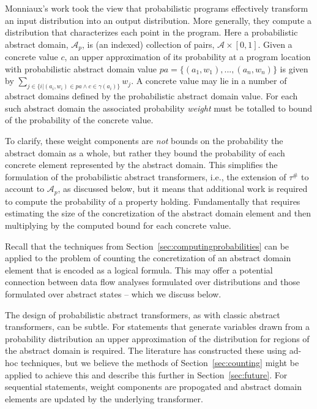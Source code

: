 Monniaux's work took the view that probabilistic programs 
effectively transform an input distribution into an output
distribution.  More generally, they compute a distribution that
characterizes each point in the program.   
Here a probabilistic abstract domain, $\mathcal{A}_p$, 
is (an indexed) collection of pairs, $\mathcal{A} \times [0,1]$.
Given a concrete value $c$, 
an upper approximation of its probability 
at a program location with probabilistic abstract domain
value $pa = \{(a_1,w_1), ..., (a_n,w_n)\}$
is given by $\sum_{j \in \{ i \vert (a_i,w_i) \in pa \wedge   
c \in \gamma(a_i)\}} w_j$.   A concrete
value may lie in a number of abstract domains defined by
the probabilistic abstract domain value.  For each such abstract
domain the associated probability \textit{weight} must be totalled
to bound of the probability of the concrete value.

To clarify, these weight components are \textit{not} bounds on the probability
the abstract domain as a whole, but rather they bound the probability
of each concrete element represented by the abstract domain.
This simplifies the formulation of the probabilistic abstract
transformers, i.e., the extension of $\tau^\#$ to account to 
$\mathcal{A}_p$, as discussed below, but it means that additional
work is required to compute the probability of a property holding.
Fundamentally that requires estimating the size of the concretization
of the abstract domain element and then multiplying by the computed bound for
each concrete value.  

Recall that the techniques from 
Section~\ref{sec:computingprobabilities} can be applied to
the problem of counting the concretization of an abstract domain element 
that is encoded as a logical formula.  This may offer a potential
connection between data flow analyses formulated over distributions
and those formulated over abstract states -- which we discuss below.

The design of probabilistic abstract transformers, as with 
classic abstract transformers, can be subtle.
For statements that generate variables drawn from a probability
distribution an upper approximation of the distribution for
regions of the abstract domain is required.  The literature
has constructed these using ad-hoc techniques, but we believe
the methods of Section~\ref{sec:counting} might be applied to 
achieve this and describe this further in Section~\ref{sec:future}.
For sequential statements, weight components are propogated
and abstract domain elements are updated by the underlying transformer.

